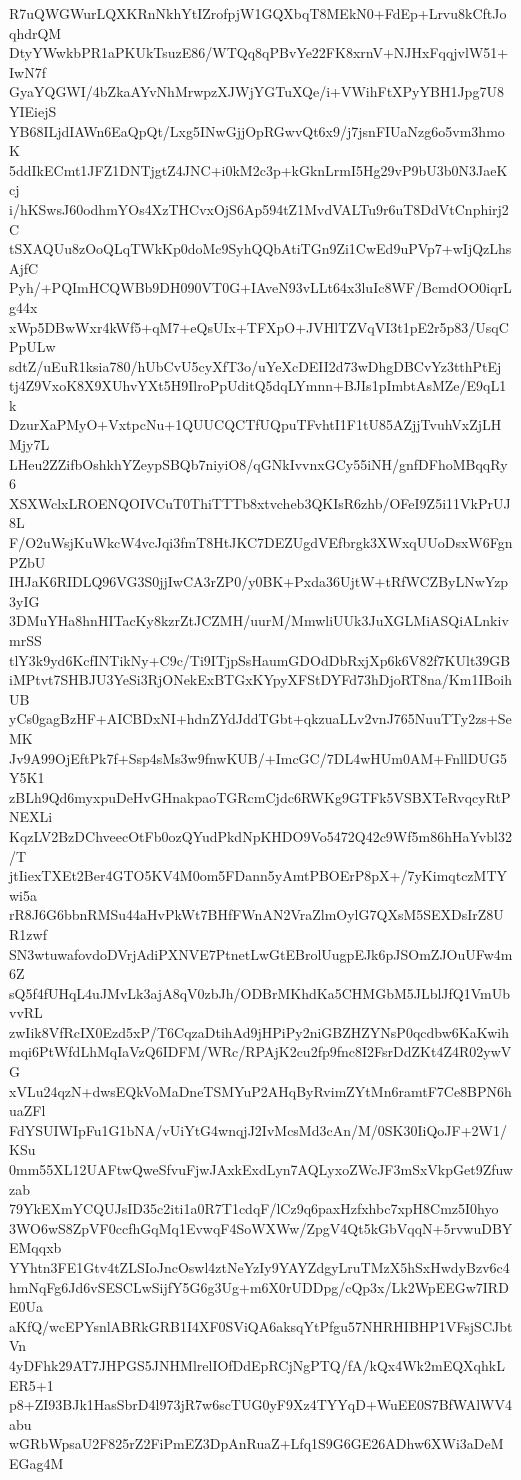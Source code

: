 R7uQWGWurLQXKRnNkhYtIZrofpjW1GQXbqT8MEkN0+FdEp+Lrvu8kCftJoqhdrQM
DtyYWwkbPR1aPKUkTsuzE86/WTQq8qPBvYe22FK8xrnV+NJHxFqqjvlW51+IwN7f
GyaYQGWI/4bZkaAYvNhMrwpzXJWjYGTuXQe/i+VWihFtXPyYBH1Jpg7U8YIEiejS
YB68ILjdIAWn6EaQpQt/Lxg5INwGjjOpRGwvQt6x9/j7jsnFIUaNzg6o5vm3hmoK
5ddIkECmt1JFZ1DNTjgtZ4JNC+i0kM2c3p+kGknLrmI5Hg29vP9bU3b0N3JaeKcj
i/hKSwsJ60odhmYOs4XzTHCvxOjS6Ap594tZ1MvdVALTu9r6uT8DdVtCnphirj2C
tSXAQUu8zOoQLqTWkKp0doMc9SyhQQbAtiTGn9Zi1CwEd9uPVp7+wIjQzLhsAjfC
Pyh/+PQImHCQWBb9DH090VT0G+IAveN93vLLt64x3luIc8WF/BcmdOO0iqrLg44x
xWp5DBwWxr4kWf5+qM7+eQsUIx+TFXpO+JVHlTZVqVI3t1pE2r5p83/UsqCPpULw
sdtZ/uEuR1ksia780/hUbCvU5cyXfT3o/uYeXcDEII2d73wDhgDBCvYz3tthPtEj
tj4Z9VxoK8X9XUhvYXt5H9IlroPpUditQ5dqLYmnn+BJIs1pImbtAsMZe/E9qL1k
DzurXaPMyO+VxtpcNu+1QUUCQCTfUQpuTFvhtI1F1tU85AZjjTvuhVxZjLHMjy7L
LHeu2ZZifbOshkhYZeypSBQb7niyiO8/qGNkIvvnxGCy55iNH/gnfDFhoMBqqRy6
XSXWclxLROENQOIVCuT0ThiTTTb8xtvcheb3QKIsR6zhb/OFeI9Z5i11VkPrUJ8L
F/O2uWsjKuWkcW4vcJqi3fmT8HtJKC7DEZUgdVEfbrgk3XWxqUUoDsxW6FgnPZbU
IHJaK6RIDLQ96VG3S0jjIwCA3rZP0/y0BK+Pxda36UjtW+tRfWCZByLNwYzp3yIG
3DMuYHa8hnHITacKy8kzrZtJCZMH/uurM/MmwliUUk3JuXGLMiASQiALnkivmrSS
tlY3k9yd6KcfINTikNy+C9c/Ti9ITjpSsHaumGDOdDbRxjXp6k6V82f7KUlt39GB
iMPtvt7SHBJU3YeSi3RjONekExBTGxKYpyXFStDYFd73hDjoRT8na/Km1IBoihUB
yCs0gagBzHF+AICBDxNI+hdnZYdJddTGbt+qkzuaLLv2vnJ765NuuTTy2zs+SeMK
Jv9A99OjEftPk7f+Ssp4sMs3w9fnwKUB/+ImcGC/7DL4wHUm0AM+FnllDUG5Y5K1
zBLh9Qd6myxpuDeHvGHnakpaoTGRcmCjdc6RWKg9GTFk5VSBXTeRvqcyRtPNEXLi
KqzLV2BzDChveecOtFb0ozQYudPkdNpKHDO9Vo5472Q42c9Wf5m86hHaYvbl32/T
jtIiexTXEt2Ber4GTO5KV4M0om5FDann5yAmtPBOErP8pX+/7yKimqtczMTYwi5a
rR8J6G6bbnRMSu44aHvPkWt7BHfFWnAN2VraZlmOylG7QXsM5SEXDsIrZ8UR1zwf
SN3wtuwafovdoDVrjAdiPXNVE7PtnetLwGtEBrolUugpEJk6pJSOmZJOuUFw4m6Z
sQ5f4fUHqL4uJMvLk3ajA8qV0zbJh/ODBrMKhdKa5CHMGbM5JLblJfQ1VmUbvvRL
zwIik8VfRcIX0Ezd5xP/T6CqzaDtihAd9jHPiPy2niGBZHZYNsP0qcdbw6KaKwih
mqi6PtWfdLhMqIaVzQ6IDFM/WRc/RPAjK2cu2fp9fnc8I2FsrDdZKt4Z4R02ywVG
xVLu24qzN+dwsEQkVoMaDneTSMYuP2AHqByRvimZYtMn6ramtF7Ce8BPN6huaZFl
FdYSUIWIpFu1G1bNA/vUiYtG4wnqjJ2IvMcsMd3cAn/M/0SK30IiQoJF+2W1/KSu
0mm55XL12UAFtwQweSfvuFjwJAxkExdLyn7AQLyxoZWcJF3mSxVkpGet9Zfuwzab
79YkEXmYCQUJsID35c2iti1a0R7T1cdqF/lCz9q6paxHzfxhbc7xpH8Cmz5I0hyo
3WO6wS8ZpVF0ccfhGqMq1EvwqF4SoWXWw/ZpgV4Qt5kGbVqqN+5rvwuDBYEMqqxb
YYhtn3FE1Gtv4tZLSIoJncOswl4ztNeYzIy9YAYZdgyLruTMzX5hSxHwdyBzv6c4
hmNqFg6Jd6vSESCLwSijfY5G6g3Ug+m6X0rUDDpg/cQp3x/Lk2WpEEGw7IRDE0Ua
aKfQ/wcEPYsnlABRkGRB1I4XF0SViQA6aksqYtPfgu57NHRHIBHP1VFsjSCJbtVn
4yDFhk29AT7JHPGS5JNHMlrelIOfDdEpRCjNgPTQ/fA/kQx4Wk2mEQXqhkLER5+1
p8+ZI93BJk1HasSbrD4l973jR7w6scTUG0yF9Xz4TYYqD+WuEE0S7BfWAlWV4abu
wGRbWpsaU2F825rZ2FiPmEZ3DpAnRuaZ+Lfq1S9G6GE26ADhw6XWi3aDeMEGag4M
